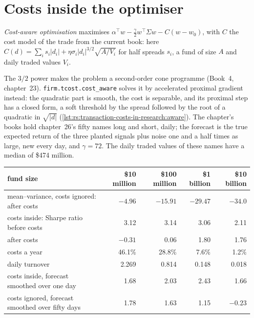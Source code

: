 \section{Costs inside the optimiser}

\begin{definition}\label{def:rs:transaction-costs-in-research:aware}
\emph{Cost-aware optimisation} maximises $\alpha^\top w - \frac\gamma2 w^\top\Sigma w - C(w - w_0)$, with $C$ the cost model of the trade
from the current book: here $C(d) = \sum_i s_i\lvert d_i\rvert + \eta\sigma_i\lvert d_i\rvert^{3/2}\sqrt{A/V_i}$ for half spreads $s_i$, a fund of size $A$ and daily traded
values $V_i$.
\end{definition}

The $3/2$ power makes the problem a second-order cone programme (Book~4, chapter~23). \texttt{firm.tcost.cost\_aware} solves it by accelerated proximal gradient
instead: the quadratic part is smooth, the cost is separable, and its proximal step has a closed form, a soft threshold by the spread followed by the root of a
quadratic in $\sqrt{\lvert d\rvert}$ (\cref{lst:rs:transaction-costs-in-research:aware}). The chapter's books hold chapter~26's fifty names long and short, daily; the
forecast is the true expected return of the three planted signals plus noise one and a half times as large, new every day, and $\gamma = 72$. The daily traded
values of these names have a median of \$474 million.

\begin{center}
\small
\begin{tabular}{@{}lrrrr@{}}
\toprule
fund size & \$10 million & \$100 million & \$1 billion & \$10 billion\\
\midrule
mean--variance, costs ignored: after costs & $-4.96$ & $-15.91$ & $-29.47$ & $-34.0$\\
costs inside: Sharpe ratio before costs & 3.12 & 3.14 & 3.06 & 2.11\\
\quad after costs & $-0.31$ & 0.06 & 1.80 & 1.76\\
\quad costs a year & 46.1\% & 28.8\% & 7.6\% & 1.2\%\\
\quad daily turnover & 2.269 & 0.814 & 0.148 & 0.018\\
costs inside, forecast smoothed over one day & 1.68 & 2.03 & 2.43 & 1.66\\
costs ignored, forecast smoothed over fifty days & 1.78 & 1.63 & 1.15 & $-0.23$\\
\bottomrule
\end{tabular}
\end{center}

